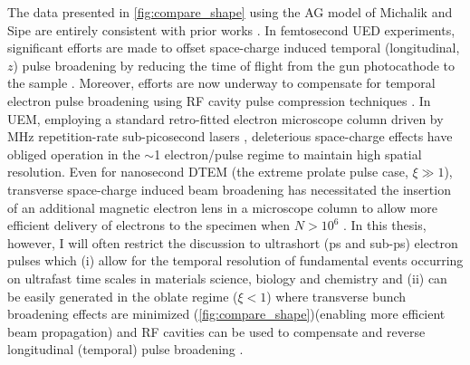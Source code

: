 The data presented in \ref{fig:compare_shape} using the AG model of Michalik and Sipe \cite{michalik_analytic_2006} are entirely consistent with prior works \cite{reed_femtosecond_2006,siwick_ultrafast_2002}.
In femtosecond UED experiments, significant efforts are made to offset space-charge induced temporal (longitudinal, $z$) pulse broadening by reducing the time of flight from the gun photocathode to the sample \cite{siwick_ultrafast_2002,reed_evolution_2009}.
Moreover, efforts are now underway to compensate for temporal electron pulse broadening using RF cavity pulse compression techniques \cite{oudheusden_electron_2007}.
In UEM, employing a standard retro-fitted electron microscope column driven by MHz repetition-rate sub-picosecond lasers \cite{lobastov_four-dimensional_2005}, deleterious space-charge effects have obliged operation in the $\sim$1 electron/pulse regime to maintain high spatial resolution.
Even for nanosecond DTEM (the extreme prolate pulse case, $\xi \gg 1 $), transverse space-charge induced beam broadening has necessitated the insertion of an additional magnetic electron lens in a microscope column to allow more efficient delivery of electrons to the specimen when $ N > 10^{6} $ \cite{lagrange_nanosecond_2008}.
In this thesis, however, I will often restrict the discussion to ultrashort (ps and sub-ps) electron pulses which (i) allow for the temporal resolution of fundamental events occurring on ultrafast time scales in materials science, biology and chemistry \cite{king_ultrafast_2005} and (ii) can be easily generated in the oblate regime ($ \xi < 1 $) where transverse bunch broadening effects are minimized (\ref{fig:compare_shape})(enabling more efficient beam propagation) and RF cavities can be used to compensate and reverse longitudinal (temporal) pulse broadening \cite{veisz_hybrid_2007}.


